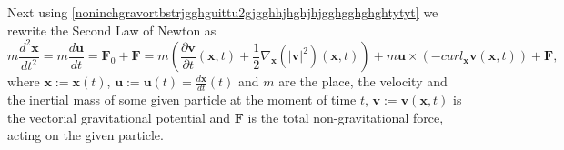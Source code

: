 \documentclass{article}
\theoremstyle{definition}
\theoremstyle{remark}
\renewcommand{\vec}[1]{\mathbf{#1}}
\newcommand{\er}{\eqref}
\newcommand{\er}{\eqref}
\begin{document}
Next using
\er{noninchgravortbstrjgghguittu2gjgghhjhghjhjgghgghghghtytyt} we
rewrite the Second Law of Newton as
\begin{equation}\label{noninchgravortbstrjgghguittu2gjgghhjhghjhjgghgghghghtytythvfghfgghjgg}
m\frac{d^2\vec x}{dt^2}=m\frac{d\vec u}{dt}=\vec F_0+\vec
F=m\left(\frac{\partial\vec v}{\partial t}(\vec
x,t)+\frac{1}{2}\nabla_{\vec x}\left(\left|\vec
v\right|^2\right)(\vec x,t)\right)+m\vec u\times \left(-curl_{\vec
x}\vec v(\vec x,t)\right)+\vec F,
\end{equation}
where $\vec x:=\vec x(t)$, $\vec u:=\vec u(t)=\frac{d\vec x}{dt}(t)$
and $m$ are the place, the velocity and the inertial mass of some
given particle at the moment of time $t$, $\vec v:=\vec v(\vec x,t)$
is the vectorial gravitational potential and $\vec F$ is the total
non-gravitational force, acting on the given particle.
\end{document}
